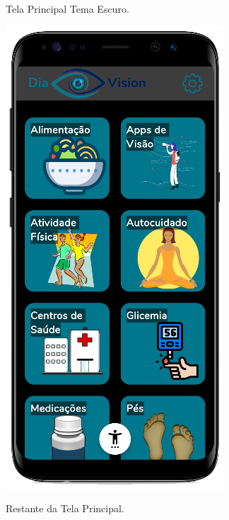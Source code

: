 \begin{figure}[htb]
    \centering
    \begin{minipage}{0.45\textwidth}
        \centering
        \caption{Tela Principal Tema Escuro.}\label{fig_app_inicio_dark}
        \includegraphics[scale=0.66]{Imagens/desenvolvimento/app/app_inicio_dark.png}
    \end{minipage}
    \hfill
    \begin{minipage}{0.45\textwidth}
        \centering
        \caption{Restante da Tela Principal.}\label{fig_app_inicio_2}

\end{minipage}
\end{figure}
